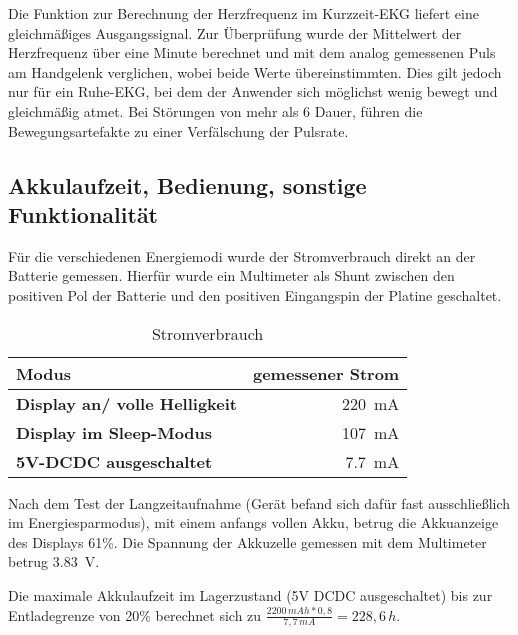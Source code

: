 Die Funktion zur Berechnung der Herzfrequenz im Kurzzeit-EKG liefert eine gleichmäßiges Ausgangssignal. Zur Überprüfung wurde der Mittelwert der Herzfrequenz über eine Minute berechnet und mit dem analog gemessenen Puls am Handgelenk verglichen, wobei beide Werte übereinstimmten. Dies gilt jedoch nur für ein Ruhe-EKG, bei dem der Anwender sich möglichst wenig bewegt und gleichmäßig atmet. Bei Störungen von mehr als \SI{6}{\sec} Dauer, führen die Bewegungsartefakte zu einer Verfälschung der Pulsrate. 

\subsection{Akkulaufzeit, Bedienung, sonstige Funktionalität}

Für die verschiedenen Energiemodi wurde der Stromverbrauch direkt an der Batterie gemessen. Hierfür wurde ein Multimeter als Shunt zwischen den positiven Pol der Batterie und den positiven Eingangspin der Platine geschaltet.\\

\begin{table}

\begin{tabular}[]{l|r}
\textbf{Modus} & \textbf{gemessener Strom} 
\\
\hline
\textbf{Display an/ volle Helligkeit} & \SI{220}{\milli\ampere} 
\\
\hline
\textbf{Display im Sleep-Modus} & \SI{107}{\milli\ampere} 
\\
\hline
\textbf{5V-DCDC ausgeschaltet} & \SI{7,7}{\milli\ampere}
\end{tabular}

\caption{Stromverbrauch}
\label{tab:Stromverbrauch}

\end{table}

Nach dem Test der Langzeitaufnahme (Gerät befand sich dafür fast ausschließlich im Energiesparmodus), mit einem anfangs vollen Akku, betrug die Akkuanzeige des Displays 61\%. Die Spannung der Akkuzelle gemessen mit dem Multimeter betrug \SI{3,83}{\volt}.

Die maximale Akkulaufzeit im Lagerzustand (5V DCDC ausgeschaltet) bis zur Entladegrenze von 20\% berechnet sich zu
$ \frac{2200\,mAh*0,8}{7,7\,mA} = 228,6\,h $.
